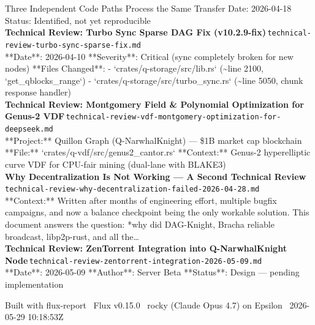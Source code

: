 \documentclass[11pt,a4paper]{article}
\begin{document}
Three Independent Code Paths Process the Same Transfer Date: 2026-04-18 \textbar{} Status: Identified, not yet reproducible\\[6pt]
\noindent\textbf{Technical Review: Turbo Sync Sparse DAG Fix (v10.2.9-fix)}\,\textcolor{qgray}{\small \texttt{technical-review-turbo-sync-sparse-fix.md}}\\
**Date**: 2026-04-10 **Severity**: Critical (sync completely broken for new nodes) **Files Changed**: - `crates/q-storage/src/lib.rs` (\textasciitilde{}line 2100, `get\_qblocks\_range`) - `crates/q-storage/src/turbo\_sync.rs` (\textasciitilde{}line 5050, chunk response handler)\\[6pt]
\noindent\textbf{Technical Review: Montgomery Field \& Polynomial Optimization for Genus-2 VDF}\,\textcolor{qgray}{\small \texttt{technical-review-vdf-montgomery-optimization-for-deepseek.md}}\\
**Project:** Quillon Graph (Q-NarwhalKnight) --- \$1B market cap blockchain **File:** `crates/q-vdf/src/genus2\_cantor.rs` **Context:** Genus-2 hyperelliptic curve VDF for CPU-fair mining (dual-lane with BLAKE3)\\[6pt]
\noindent\textbf{Why Decentralization Is Not Working --- A Second Technical Review}\,\textcolor{qgray}{\small \texttt{technical-review-why-decentralization-failed-2026-04-28.md}}\\
**Context:** Written after months of engineering effort, multiple bugfix campaigns, and now a balance checkpoint being the only workable solution. This document answers the question: *why did DAG-Knight, Bracha reliable broadcast, libp2p-rust, and all the\ldots{}\\[6pt]
\noindent\textbf{Technical Review: ZenTorrent Integration into Q-NarwhalKnight Node}\,\textcolor{qgray}{\small \texttt{technical-review-zentorrent-integration-2026-05-09.md}}\\
**Date**: 2026-05-09 **Author**: Server Beta **Status**: Design --- pending implementation\\[6pt]
\vfill
\begin{center}\small\color{qgray}
Built with flux-report \textbullet\ Flux v0.15.0 \textbullet\ rocky (Claude Opus 4.7) on Epsilon \textbullet\ 2026-05-29 10:18:53Z
\end{center}
\end{document}
